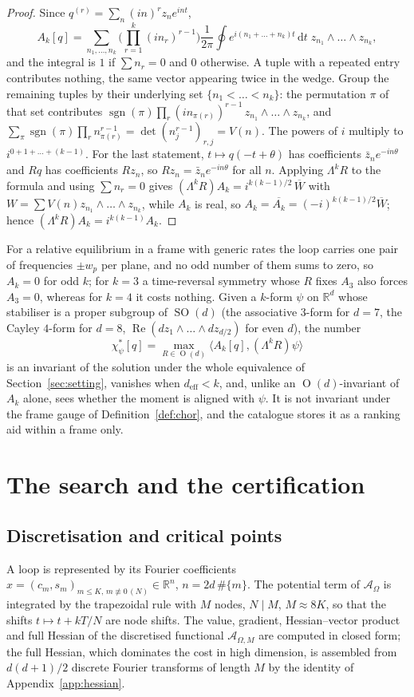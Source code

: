 \documentclass[11pt]{amsart}
\theoremstyle{definition}
\newcommand{\R}{\mathbb{R}}
\newcommand{\act}{\mathcal{A}}
\newcommand{\dd}{\,\mathrm{d}}
\newcommand{\deff}{d_{\mathrm{eff}}}
\DeclareMathOperator{\SO}{SO}
\DeclareMathOperator{\Orth}{O}
\DeclareMathOperator{\sgn}{sgn}
\begin{document}
\begin{proof}
Since $q^{(r)}=\sum_n(in)^rz_ne^{int}$,
\[
A_k[q]=\sum_{n_1,\dots,n_k}\Big(\prod_{r=1}^k(in_r)^{r-1}\Big)\frac1{2\pi}\oint e^{i(n_1+\dots+n_k)t}\dd t\; z_{n_1}\wedge\dots\wedge z_{n_k},
\]
and the integral is $1$ if $\sum n_r=0$ and $0$ otherwise. A tuple with a repeated entry contributes nothing, the same vector appearing twice in the wedge. Group the remaining tuples by their underlying set $\{n_1<\dots<n_k\}$: the permutation $\pi$ of that set contributes $\sgn(\pi)\prod_r(in_{\pi(r)})^{r-1}\,z_{n_1}\wedge\dots\wedge z_{n_k}$, and $\sum_\pi\sgn(\pi)\prod_rn_{\pi(r)}^{r-1}=\det(n_j^{r-1})_{r,j}=V(n)$. The powers of $i$ multiply to $i^{0+1+\dots+(k-1)}$. For the last statement, $t\mapsto q(-t+\theta)$ has coefficients $\bar z_ne^{-in\theta}$ and $Rq$ has coefficients $Rz_n$, so $Rz_n=\bar z_ne^{-in\theta}$ for all $n$. Applying $\Lambda^kR$ to the formula and using $\sum n_r=0$ gives $(\Lambda^kR)A_k=i^{k(k-1)/2}\,\overline W$ with $W=\sum V(n)z_{n_1}\wedge\dots\wedge z_{n_k}$, while $A_k$ is real, so $A_k=\overline{A_k}=(-i)^{k(k-1)/2}\overline W$; hence $(\Lambda^kR)A_k=i^{k(k-1)}A_k$.
\end{proof}

For a relative equilibrium in a frame with generic rates the loop carries one pair of frequencies $\pm w_p$ per plane, and no odd number of them sums to zero, so $A_k=0$ for odd $k$; for $k=3$ a time-reversal symmetry whose $R$ fixes $A_3$ also forces $A_3=0$, whereas for $k=4$ it costs nothing. Given a $k$-form $\psi$ on $\R^d$ whose stabiliser is a proper subgroup of $\SO(d)$ (the associative $3$-form for $d=7$, the Cayley $4$-form for $d=8$, $\operatorname{Re}(dz_1\wedge\dots\wedge dz_{d/2})$ for even $d$), the number
\[
\chi^*_\psi[q]=\max_{R\in\Orth(d)}\big\langle A_k[q],(\Lambda^kR)\psi\big\rangle
\]
is an invariant of the solution under the whole equivalence of Section~\ref{sec:setting}, vanishes when $\deff<k$, and, unlike an $\Orth(d)$-invariant of $A_k$ alone, sees whether the moment is aligned with $\psi$. It is not invariant under the frame gauge of Definition~\ref{def:chor}, and the catalogue stores it as a ranking aid within a frame only.

\section{The search and the certification}\label{sec:search}

\subsection{Discretisation and critical points}
A loop is represented by its Fourier coefficients $x=(c_m,s_m)_{m\le K,\,m\not\equiv0\,(N)}\in\R^n$, $n=2d\,\#\{m\}$. The potential term of $\act_\Omega$ is integrated by the trapezoidal rule with $M$ nodes, $N\mid M$, $M\approx8K$, so that the shifts $t\mapsto t+kT/N$ are node shifts. The value, gradient, Hessian--vector product and full Hessian of the discretised functional $\act_{\Omega,M}$ are computed in closed form; the full Hessian, which dominates the cost in high dimension, is assembled from $d(d+1)/2$ discrete Fourier transforms of length $M$ by the identity of Appendix~\ref{app:hessian}.
\end{document}
